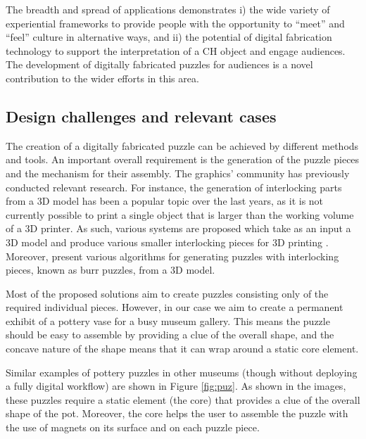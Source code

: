\documentclass[acmlarge,screen]{acmart}
\begin{document}
The breadth and spread of applications demonstrates i) the wide variety of experiential frameworks to provide people with the opportunity to ``meet'' and ``feel'' culture in alternative ways, and ii) the potential of digital fabrication technology to support the interpretation of a CH object and engage audiences. The development of digitally fabricated puzzles for audiences is a novel contribution to the wider efforts in this area.
 
 \subsection{Design challenges and relevant cases}
 
The creation of a digitally fabricated puzzle can be achieved by different methods and tools. An important overall requirement is the generation of the puzzle pieces and the mechanism for their assembly. The graphics' community has previously conducted relevant research. For instance, the generation of interlocking parts from a 3D model has been a popular topic over the last years, as it is not currently possible to print a single object that is larger than the working volume of a 3D printer. As such, various systems are proposed which take as an input a 3D model and produce various smaller interlocking pieces for 3D printing \cite{Song:2015:POI:2797416.2797510,luo_chopper:_2012,klein_interlocking_2014,skouras_interactive_2015}. Moreover, \cite{Xin:2011:MBP:2010324.1964992,Song:2012:RIP:2366145.2366147,sun_computational_2015} present various algorithms for generating puzzles with interlocking pieces, known as burr puzzles, from a 3D model. 

Most of the proposed solutions aim to create puzzles consisting only of the required individual pieces. However, in our case we aim to create a permanent exhibit of a pottery vase for a busy museum gallery. This means the puzzle should be easy to assemble by providing a clue of the overall shape, and the concave nature of the shape means that it can wrap around a static core element. 

Similar examples of pottery puzzles in other museums (though without deploying a fully digital workflow) are shown in Figure \ref{fig:puz}. As shown in the images, these puzzles require a static element (the core) that provides a clue of the overall shape of the pot. Moreover, the core helps the user to assemble the puzzle with the use of magnets on its surface and on each puzzle piece. 
\end{document}
